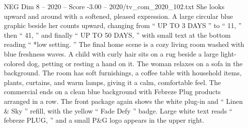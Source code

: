 \begin{textsample}{NEG Dim 8 – 2020 – Score -3.00 – 2020/tv\_com\_2020\_102.txt}
She looks upward and around with a softened, pleased expression.
A large circular blue graphic beside her counts upward, changing from “ UP TO 3 DAYS ” to “ 11, ” then “ 41, ” and finally “ UP TO 50 DAYS, ” with small text at the bottom reading “ *low setting. ” The final home scene is a cozy living room washed with blue freshness waves.
A child with curly hair sits on a rug beside a large light-colored dog, petting or resting a hand on it.
The woman relaxes on a sofa in the background.
The room has soft furnishings, a coffee table with household items, plants, curtains, and warm lamps, giving it a calm, comfortable feel.
The commercial ends on a clean blue background with Febreze Plug products arranged in a row.
The front package again shows the white plug-in and “ Linen \& Sky ” refill, with the yellow “ Fade Defy ” badge.
Large white text reads “ febreze PLUG, ” and a small P\&G logo appears in the upper right.

\end{textsample}
